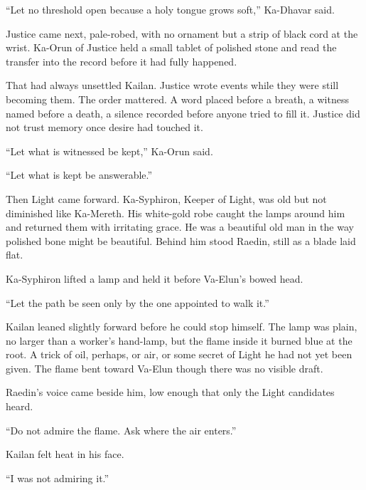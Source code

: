 “Let no threshold open because a holy tongue grows soft,” Ka-Dhavar said.\par

Justice came next, pale-robed, with no ornament but a strip of black cord at the wrist. Ka-Orun of Justice held a small tablet of polished stone and read the transfer into the record before it had fully happened.\par

That had always unsettled Kailan. Justice wrote events while they were still becoming them. The order mattered. A word placed before a breath, a witness named before a death, a silence recorded before anyone tried to fill it. Justice did not trust memory once desire had touched it.\par

“Let what is witnessed be kept,” Ka-Orun said.\par

“Let what is kept be answerable.”\par

Then Light came forward. Ka-Syphiron, Keeper of Light, was old but not diminished like Ka-Mereth. His white-gold robe caught the lamps around him and returned them with irritating grace. He was a beautiful old man in the way polished bone might be beautiful. Behind him stood Raedin, still as a blade laid flat.\par

Ka-Syphiron lifted a lamp and held it before Va-Elun’s bowed head.\par

“Let the path be seen only by the one appointed to walk it.”\par

Kailan leaned slightly forward before he could stop himself. The lamp was plain, no larger than a worker’s hand-lamp, but the flame inside it burned blue at the root. A trick of oil, perhaps, or air, or some secret of Light he had not yet been given. The flame bent toward Va-Elun though there was no visible draft.\par

Raedin’s voice came beside him, low enough that only the Light candidates heard.\par

“Do not admire the flame. Ask where the air enters.”\par

Kailan felt heat in his face.\par

“I was not admiring it.”\par

